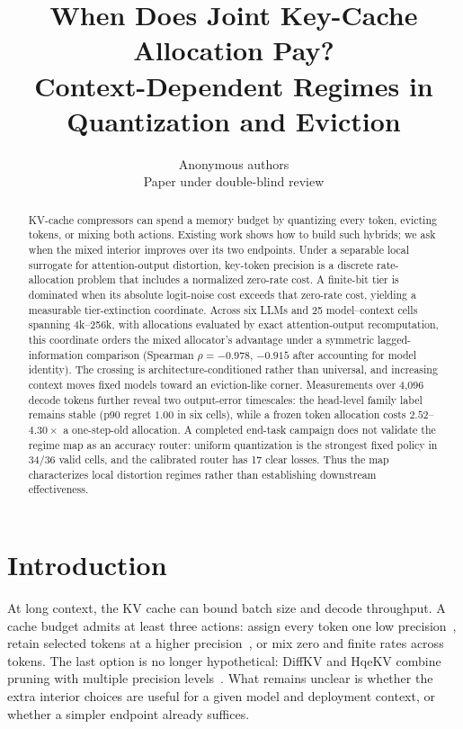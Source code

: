 \documentclass{article}
\title{When Does Joint Key-Cache Allocation Pay?\\
Context-Dependent Regimes in Quantization and Eviction}
\author{Anonymous authors \\ Paper under double-blind review}
\theoremstyle{definition}
\begin{document}
\maketitle

\begin{abstract}
KV-cache compressors can spend a memory budget by quantizing every token, evicting tokens, or mixing both actions.  Existing work shows how to build such hybrids; we ask when the mixed interior improves over its two endpoints.  Under a separable local surrogate for attention-output distortion, key-token precision is a discrete rate-allocation problem that includes a normalized zero-rate cost.  A finite-bit tier is dominated when its absolute logit-noise cost exceeds that zero-rate cost, yielding a measurable tier-extinction coordinate.  Across six LLMs and 25 model--context cells spanning 4k--256k, with allocations evaluated by exact attention-output recomputation, this coordinate orders the mixed allocator's advantage under a symmetric lagged-information comparison (Spearman $\rho=-0.978$, $-0.915$ after accounting for model identity).  The crossing is architecture-conditioned rather than universal, and increasing context moves fixed models toward an eviction-like corner.  Measurements over 4,096 decode tokens further reveal two output-error timescales: the head-level family label remains stable (p90 regret $1.00$ in six cells), while a frozen token allocation costs $2.52$--$4.30\times$ a one-step-old allocation.  A completed end-task campaign does not validate the regime map as an accuracy router: uniform quantization is the strongest fixed policy in 34/36 valid cells, and the calibrated router has 17 clear losses.  Thus the map characterizes local distortion regimes rather than establishing downstream effectiveness.
\end{abstract}

\section{Introduction}

At long context, the KV cache can bound batch size and decode throughput.  A cache budget admits at least three actions: assign every token one low precision~\citep{liu2024kivi,hooper2024kvquant,zandieh2025turboquant}, retain selected tokens at a higher precision~\citep{zhang2023h2o,liu2023scissorhands,li2024snapkv,xiao2024streamingllm}, or mix zero and finite rates across tokens.  The last option is no longer hypothetical: DiffKV and HqeKV combine pruning with multiple precision levels~\citep{zhang2025diffkv,wang-etal-2026-hqekv}.  What remains unclear is whether the extra interior choices are useful for a given model and deployment context, or whether a simpler endpoint already suffices.
\end{document}

